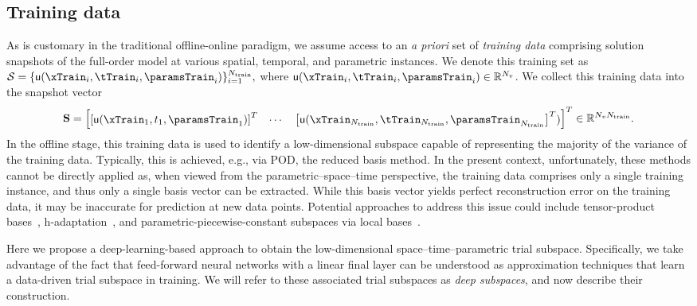\documentclass[3p,computermodern,10pt]{elsarticle}
\begin{document}
\subsection{Training data}
As is customary in the traditional offline-online paradigm, we assume access to an \textit{a priori} set of \textit{training data} comprising solution snapshots of the full-order model at various spatial, temporal, and parametric instances. We denote this training set as %
$\TrainingData = \{\PDEState(\xTrain_i,\tTrain_i,\paramsTrain_i) \}_{i=1}^{\NTrain},$ where $\PDEState(\xTrain_i,\tTrain_i,\paramsTrain_i) \in \RR{\NVars}$.
We collect this training data into the snapshot vector
$$\TrainingDataVec = \begin{bmatrix} \left[\PDEState(\xTrain_1,t_1,\paramsTrain_1)\right]^T & \cdots &  \left[\PDEState(\xTrain_{\NTrain},\tTrain_{\NTrain},\paramsTrain_{\NTrain}\right]^T )\end{bmatrix}^T \in \RR{\NVars  \NTrain}.$$ 
In the offline stage, this training data is used to identify a low-dimensional subspace capable of representing the majority of the variance of the training data. Typically, this is achieved, e.g., via POD, the reduced basis method. 
In the present context, unfortunately, these methods cannot be directly applied as, when viewed from the parametric--space--time perspective, the training data comprises only a single training instance, and thus only a single basis vector can be extracted. While this basis vector yields perfect reconstruction error on the training data, it may be inaccurate for prediction at new data points. Potential approaches to address this issue could include tensor-product bases~\cite{choi_stlspg}, h-adaptation~\cite{carlberg_hadaptation,ETTER2020112931}, and parametric-piecewise-constant subspaces via local bases~\cite{}. 

Here we propose a deep-learning-based approach to obtain the low-dimensional space--time--parametric trial subspace. Specifically, we take advantage of the fact that feed-forward neural networks with a linear final layer can be understood as approximation techniques that learn a data-driven trial subspace in training. We will refer to these associated trial subspaces as \textit{deep subspaces}, and now describe their construction. 
\end{document}
